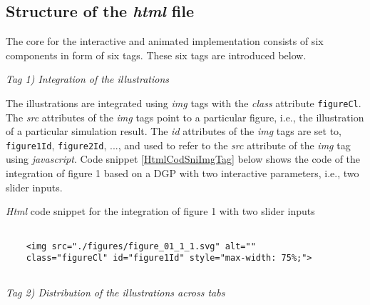 \documentclass[12pt]{article}
\begin{document}

\subsection{Structure of the \emph{html} file}\label{SecHowHtm}

The core for the interactive and animated implementation consists of six components in form of six tags. 
%
These six tags are introduced below. 


\vspace{1em}
\noindent\emph{Tag 1) Integration of the illustrations}

The illustrations are integrated using \emph{img} tags with the \emph{class} attribute \texttt{figureCl}. 
%
The \emph{src} attributes of the \emph{img} tags point to a particular figure, i.e., the illustration of a particular simulation result. 
%
The \emph{id} attributes of the \emph{img} tags are set to, \texttt{figure1Id}, \texttt{figure2Id}, ..., and used to refer to the \emph{src} attribute of the \emph{img} tag using \emph{javascript}. 
%
Code snippet \ref{HtmlCodSniImgTag} below shows the code of the integration of figure 1 based on a DGP with two interactive parameters, i.e., two slider inputs. 
%
\begin{CodeSnippet}[!hp]
	\centering
	\caption{\emph{Html} code snippet for the integration of figure 1 with two slider inputs}
	\footnotesize
	\vspace{0.25cm}
	\begin{BVerbatim}
		
	<img src="./figures/figure_01_1_1.svg" alt=""
	class="figureCl" id="figure1Id" style="max-width: 75%
		
	\end{BVerbatim}
	\label{HtmlCodSniImgTag}
\end{CodeSnippet}


\vspace{1em}
\noindent\emph{Tag 2) Distribution of the illustrations across tabs}
\end{document}
